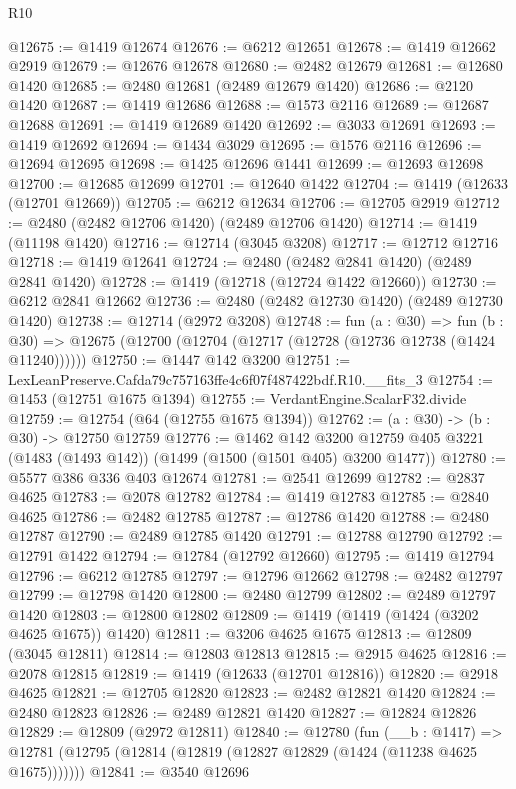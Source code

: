 \begin{lexlean}{R10}
\begin{coremodule}
@12675 := @1419 @12674
@12676 := @6212 @12651
@12678 := @1419 @12662 @2919
@12679 := @12676 @12678
@12680 := @2482 @12679
@12681 := @12680 @1420
@12685 := @2480 @12681 (@2489 @12679 @1420)
@12686 := @2120 @1420
@12687 := @1419 @12686
@12688 := @1573 @2116
@12689 := @12687 @12688
@12691 := @1419 @12689 @1420
@12692 := @3033 @12691
@12693 := @1419 @12692
@12694 := @1434 @3029
@12695 := @1576 @2116
@12696 := @12694 @12695
@12698 := @1425 @12696 @1441
@12699 := @12693 @12698
@12700 := @12685 @12699
@12701 := @12640 @1422
@12704 := @1419 (@12633 (@12701 @12669))
@12705 := @6212 @12634
@12706 := @12705 @2919
@12712 := @2480 (@2482 @12706 @1420) (@2489 @12706 @1420)
@12714 := @1419 (@11198 @1420)
@12716 := @12714 (@3045 @3208)
@12717 := @12712 @12716
@12718 := @1419 @12641
@12724 := @2480 (@2482 @2841 @1420) (@2489 @2841 @1420)
@12728 := @1419 (@12718 (@12724 @1422 @12660))
@12730 := @6212 @2841 @12662
@12736 := @2480 (@2482 @12730 @1420) (@2489 @12730 @1420)
@12738 := @12714 (@2972 @3208)
@12748 := fun (a : @30) =>
  fun (b : @30) => @12675 (@12700 (@12704 (@12717 (@12728 (@12736 @12738 (@1424 @11240))))))
@12750 := @1447 @142 @3200
@12751 := LexLeanPreserve.Cafda79c757163ffe4c6f07f487422bdf.R10.__fits_3
@12754 := @1453 (@12751 @1675 @1394)
@12755 := VerdantEngine.ScalarF32.divide
@12759 := @12754 (@64 (@12755 @1675 @1394))
@12762 := (a : @30) -> (b : @30) -> @12750 @12759
@12776 := @1462
    @142
    @3200
    @12759
    @405
    @3221
    (@1483 (@1493 @142))
    (@1499 (@1500 (@1501 @405) @3200 @1477))
@12780 := @5577 @386 @336 @403 @12674
@12781 := @2541 @12699
@12782 := @2837 @4625
@12783 := @2078 @12782
@12784 := @1419 @12783
@12785 := @2840 @4625
@12786 := @2482 @12785
@12787 := @12786 @1420
@12788 := @2480 @12787
@12790 := @2489 @12785 @1420
@12791 := @12788 @12790
@12792 := @12791 @1422
@12794 := @12784 (@12792 @12660)
@12795 := @1419 @12794
@12796 := @6212 @12785
@12797 := @12796 @12662
@12798 := @2482 @12797
@12799 := @12798 @1420
@12800 := @2480 @12799
@12802 := @2489 @12797 @1420
@12803 := @12800 @12802
@12809 := @1419 (@1419 (@1424 (@3202 @4625 @1675)) @1420)
@12811 := @3206 @4625 @1675
@12813 := @12809 (@3045 @12811)
@12814 := @12803 @12813
@12815 := @2915 @4625
@12816 := @2078 @12815
@12819 := @1419 (@12633 (@12701 @12816))
@12820 := @2918 @4625
@12821 := @12705 @12820
@12823 := @2482 @12821 @1420
@12824 := @2480 @12823
@12826 := @2489 @12821 @1420
@12827 := @12824 @12826
@12829 := @12809 (@2972 @12811)
@12840 := @12780
    (fun (__b : @1417) =>
    @12781 (@12795 (@12814 (@12819 (@12827 @12829 (@1424 (@11238 @4625 @1675)))))))
@12841 := @3540 @12696

\end{coremodule}
\end{lexlean}
